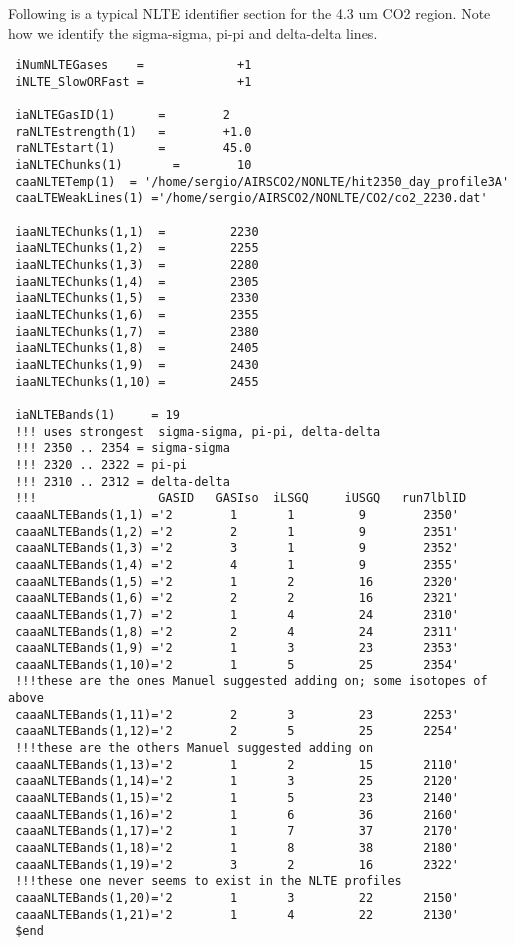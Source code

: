 \documentclass[12pt]{article}
\begin{document}
{{\vspace{0.25in} 
Following is a typical NLTE identifier section for the 4.3 um CO2 region. Note
how we identify the sigma-sigma, pi-pi and delta-delta lines.

\begin{verbatim}
 iNumNLTEGases    =             +1 
 iNLTE_SlowORFast =             +1 
 
 iaNLTEGasID(1)      =        2 
 raNLTEstrength(1)   =        +1.0 
 raNLTEstart(1)      =        45.0
 iaNLTEChunks(1)       =        10 
 caaNLTETemp(1)  = '/home/sergio/AIRSCO2/NONLTE/hit2350_day_profile3A'  
 caaLTEWeakLines(1) ='/home/sergio/AIRSCO2/NONLTE/CO2/co2_2230.dat' 

 iaaNLTEChunks(1,1)  =         2230 
 iaaNLTEChunks(1,2)  =         2255 
 iaaNLTEChunks(1,3)  =         2280 
 iaaNLTEChunks(1,4)  =         2305 
 iaaNLTEChunks(1,5)  =         2330 
 iaaNLTEChunks(1,6)  =         2355 
 iaaNLTEChunks(1,7)  =         2380 
 iaaNLTEChunks(1,8)  =         2405 
 iaaNLTEChunks(1,9)  =         2430 
 iaaNLTEChunks(1,10) =         2455 
 
 iaNLTEBands(1)     = 19
 !!! uses strongest  sigma-sigma, pi-pi, delta-delta 
 !!! 2350 .. 2354 = sigma-sigma 
 !!! 2320 .. 2322 = pi-pi 
 !!! 2310 .. 2312 = delta-delta 
 !!!                 GASID   GASIso  iLSGQ     iUSGQ   run7lblID 
 caaaNLTEBands(1,1) ='2        1       1         9        2350' 
 caaaNLTEBands(1,2) ='2        2       1         9        2351' 
 caaaNLTEBands(1,3) ='2        3       1         9        2352' 
 caaaNLTEBands(1,4) ='2        4       1         9        2355' 
 caaaNLTEBands(1,5) ='2        1       2         16       2320' 
 caaaNLTEBands(1,6) ='2        2       2         16       2321' 
 caaaNLTEBands(1,7) ='2        1       4         24       2310' 
 caaaNLTEBands(1,8) ='2        2       4         24       2311' 
 caaaNLTEBands(1,9) ='2        1       3         23       2353'  
 caaaNLTEBands(1,10)='2        1       5         25       2354'  
 !!!these are the ones Manuel suggested adding on; some isotopes of above
 caaaNLTEBands(1,11)='2        2       3         23       2253'  
 caaaNLTEBands(1,12)='2        2       5         25       2254'  
 !!!these are the others Manuel suggested adding on
 caaaNLTEBands(1,13)='2        1       2         15       2110'  
 caaaNLTEBands(1,14)='2        1       3         25       2120'  
 caaaNLTEBands(1,15)='2        1       5         23       2140'  
 caaaNLTEBands(1,16)='2        1       6         36       2160'  
 caaaNLTEBands(1,17)='2        1       7         37       2170'  
 caaaNLTEBands(1,18)='2        1       8         38       2180'  
 caaaNLTEBands(1,19)='2        3       2         16       2322'
 !!!these one never seems to exist in the NLTE profiles
 caaaNLTEBands(1,20)='2        1       3         22       2150'  
 caaaNLTEBands(1,21)='2        1       4         22       2130'  
 $end 


\end{verbatim}}}
\end{document}
